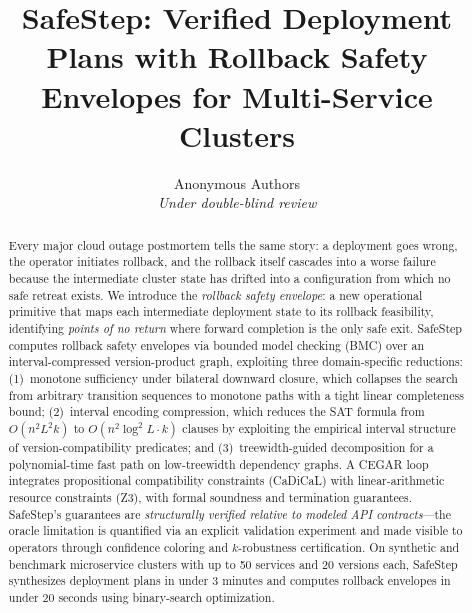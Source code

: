 \documentclass[10pt,twocolumn]{article}
\title{SafeStep: Verified Deployment Plans with Rollback Safety Envelopes for Multi-Service Clusters}
\author{%
  Anonymous Authors \\
  \textit{Under double-blind review}
}
\date{}
\begin{document}
\maketitle

\begin{abstract}
Every major cloud outage postmortem tells the same story: a deployment goes wrong, the operator initiates rollback, and the rollback itself cascades into a worse failure because the intermediate cluster state has drifted into a configuration from which no safe retreat exists. We introduce the \emph{rollback safety envelope}: a new operational primitive that maps each intermediate deployment state to its rollback feasibility, identifying \emph{points of no return} where forward completion is the only safe exit. SafeStep computes rollback safety envelopes via bounded model checking (BMC) over an interval-compressed version-product graph, exploiting three domain-specific reductions: (1)~monotone sufficiency under bilateral downward closure, which collapses the search from arbitrary transition sequences to monotone paths with a tight linear completeness bound; (2)~interval encoding compression, which reduces the SAT formula from $O(n^2 L^2 k)$ to $O(n^2 \log^2\!L \cdot k)$ clauses by exploiting the empirical interval structure of version-compatibility predicates; and (3)~treewidth-guided decomposition for a polynomial-time fast path on low-treewidth dependency graphs. A CEGAR loop integrates propositional compatibility constraints (CaDiCaL) with linear-arithmetic resource constraints (Z3), with formal soundness and termination guarantees. SafeStep's guarantees are \emph{structurally verified relative to modeled API contracts}---the oracle limitation is quantified via an explicit validation experiment and made visible to operators through confidence coloring and $k$-robustness certification. On synthetic and benchmark microservice clusters with up to 50 services and 20 versions each, SafeStep synthesizes deployment plans in under 3 minutes and computes rollback envelopes in under 20 seconds using binary-search optimization.
\end{abstract}


\end{document}
